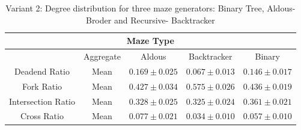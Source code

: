      \begin{table}[!h]
        \begin{center} 
            \caption{Variant 2: Degree distribution for three maze generators: Binary Tree, Aldous-Broder and Recursive- Backtracker} 
        \begin{tabular}{ c c c c c} 
        \multicolumn{5}{c}{Maze Type} \\
        \hline
        &Aggregate&Aldous&Backtracker&Binary\\
        \hline
    Deadend Ratio&Mean&$0.169\pm 0.025$&$0.067\pm 0.013$&$0.146\pm 0.017$\\    
        \hline
    Fork Ratio&Mean&$0.427\pm 0.034$&$0.575\pm 0.026$&$0.436\pm 0.019$\\ 
        \hline
    Intersection Ratio&Mean&$0.328\pm 0.025$&$0.325\pm 0.024$&$0.361\pm 0.021$\\   
        \hline
    Cross Ratio&Mean&$0.077\pm 0.021$&$0.034\pm 0.010$&$0.057\pm 0.010$\\   
        \hline   
         \end{tabular} 
        \end{center}
         \end{table}
